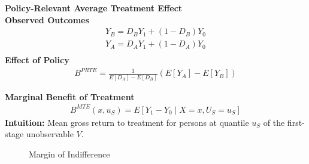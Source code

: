 \begin{frame}
\textbf{Policy-Relevant Average Treatment Effect} \\ \vspace{15pt}  
\textbf{Observed Outcomes}
\begin{align*}
Y_B = D_B Y_1 + (1 - D_B) Y_0 \\
Y_A = D_A Y_1 + (1 - D_A) Y_0 \\
\end{align*}
\textbf{Effect of Policy}
\begin{align*}
B^{PRTE} = \frac{1}{E[D_A] - E[D_B]} (E[Y_A] - E[Y_B])
\end{align*}
\end{frame}


\begin{frame}
\textbf{Marginal Benefit of Treatment}
\begin{align*}
B^{MTE}(x, u_S) = E [Y_1 - Y_0 \mid X = x, U_S = u_S]
\end{align*}
\textbf{Intuition:} Mean gross return to treatment for persons at quantile \(u_S\) of the first-stage unobservable \(V\).
\end{frame}


\begin{frame}
\begin{figure}[htp]\centering
	\caption{Margin of Indifference}\label{Margin Indifference}
\end{figure}
\end{frame}


